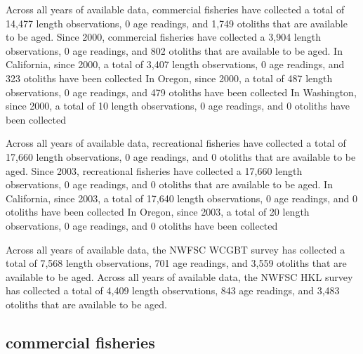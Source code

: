 \documentclass[11pt,
  english,
  letterpaper,
]{article}
\begin{document}
Across all years of available data, commercial fisheries have collected a total of 14,477 length observations, 0 age readings, and 1,749 otoliths that are available to be aged. Since 2000, commercial fisheries have collected a 3,904 length observations, 0 age readings, and 802 otoliths that are available to be aged. In California, since 2000, a total of 3,407 length observations, 0 age readings, and 323 otoliths have been collected In Oregon, since 2000, a total of 487 length observations, 0 age readings, and 479 otoliths have been collected In Washington, since 2000, a total of 10 length observations, 0 age readings, and 0 otoliths have been collected

\leavevmode\tagmcend\tagstructend\par


Across all years of available data, recreational fisheries have collected a total of 17,660 length observations, 0 age readings, and 0 otoliths that are available to be aged. Since 2003, recreational fisheries have collected a 17,660 length observations, 0 age readings, and 0 otoliths that are available to be aged. In California, since 2003, a total of 17,640 length observations, 0 age readings, and 0 otoliths have been collected In Oregon, since 2003, a total of 20 length observations, 0 age readings, and 0 otoliths have been collected

\leavevmode\tagmcend\tagstructend\par


Across all years of available data, the NWFSC WCGBT survey has collected a total of 7,568 length observations, 701 age readings, and 3,559 otoliths that are available to be aged. Across all years of available data, the NWFSC HKL survey has collected a total of 4,409 length observations, 843 age readings, and 3,483 otoliths that are available to be aged.

\leavevmode\tagmcend\tagstructend\par


\hypertarget{commercial-fisheries-24}{%
\subsection{commercial fisheries}\label{commercial-fisheries-24}}

\leavevmode\tagmcend\tagstructend
\end{document}
